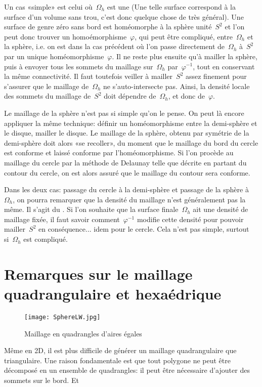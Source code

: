\medskip
Un cas «simple» est celui où~$\Omega_h$ est une  (Une telle surface correspond à la surface d'un volume sans trou, c'est donc quelque chose de très général).
Une surface de genre zéro sans bord est homéomorphe à la sphère unité~$S^2$ et l'on peut donc trouver un homoémorphisme~$\varphi$, qui peut être compliqué, entre~$\Omega_h$ et la sphère, i.e. on est dans la cas précédent où l'on passe directement de~$\Omega_h$ à~$S^2$ par un unique homéomorphisme~$\varphi$. Il ne reste plus ensuite qu'à mailler la sphère, puis à envoyer tous les sommets du maillage sur~$\Omega_h$ par~$\varphi^{-1}$, tout en conservant la même connectivité. Il faut toutefois veiller à mailler~$S^2$ assez finement pour s'assurer que le maillage de~$\Omega_h$ ne s'auto-intersecte pas. Ainsi, la densité locale des sommets du maillage de~$S^2$ doit dépendre de~$\Omega_h$, et donc de~$\varphi$.

Le maillage de la sphère n'est pas si simple qu'on le pense.
On peut là encore appliquer la même technique: définir un homéomorphisme entre la demi-sphère et le disque, mailler le disque. Le maillage de la sphère, obtenu par symétrie de la demi-sphère doit alors «se recoller», du moment que le maillage du bord du cercle est conforme et laissé conforme par l'homéomorphisme. Si l'on procède au maillage du cercle par la méthode de Delaunay telle que décrite en partant du contour du cercle, on est alors assuré que le maillage du contour sera conforme.

Dans les deux cas: passage du cercle à la demi-sphère et passage de la sphère à~$\Omega_h$, on pourra remarquer que la densité du maillage n'est généralement pas la même. Il s'agit du . Si l'on souhaite que la surface finale~$\Omega_h$ ait une densité de maillage fixée, il faut savoir comment~$\varphi^{-1}$ modifie cette densité pour pouvoir mailler~$S^2$ en conséquence... idem pour le cercle. Cela n'est pas simple, surtout si~$\Omega_h$ est compliqué.

\medskip\ifVersionDuDocEstVincent\else\newpage\fi
\section{Remarques sur le maillage quadrangulaire et hexaédrique}\label{Sec-MeshQuad}

\begin{wrapfigure}{r}{45mm}
\begin{center}
\texttt{[image: SphereLW.jpg]}
\end{center}
\caption{Maillage en quadrangles d'aires égales}\label{Fig-sphereLW}
\end{wrapfigure}
Même en 2D, il est plus difficile de générer un maillage quadrangulaire que triangulaire.
Une raison fondamentale est que tout polygone ne peut être décomposé en un ensemble de quadrangles: il peut être nécessaire d'ajouter des sommets sur le bord. Et 

